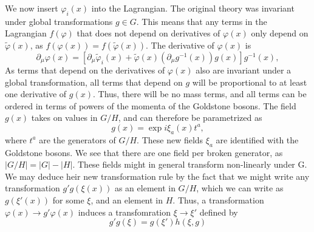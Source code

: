 \documentclass{article}
\begin{document}

We now insert $\varphi_i(x)$ into the Lagrangian.
The original theory was invariant under global transformations $g \in G$.
This means that any terms in the Lagrangian $f(\varphi)$ that does not depend on derivatives of $\varphi(x)$ only depend on $\tilde \varphi(x)$, as $f(\varphi(x)) = f(\tilde \varphi(x))$.
The derivative of $\varphi(x)$ is
\begin{equation}
    \partial_\mu \varphi(x) = [\partial_\mu \tilde \varphi_i(x) + \tilde \varphi(x) (\partial_\mu g^{-1}(x)) g(x) ]g^{-1}(x),
\end{equation}
As terms that depend on the derivatives of $\varphi(x)$ also are invariant under a global transformation, all terms that depend on $g$ will be proportional to at least one derivative of $g(x)$.
Thus, there will be no mass terms, and all terms can be ordered in terms of powers of the momenta of the Goldstone bosons.
The field $g(x)$ takes on values in $G / H$, and can therefore be parametrized as 
\begin{equation}
    g(x) = \exp{i \xi_a(x) t^a},
\end{equation}
where $t^a$ are the generators of $G / H$. 
These new fields $\xi_a$ are identified with the Goldstone bosons.
We see that there are one field per broken generator, as $|G/H| = |G| - |H|$.
These fields might in general transform non-linearly under G.
We may deduce heir new transformation rule by the fact that we might write any transformation $g' g(\xi(x))$ as an element in $G/H$, which we can write as $g(\xi'(x))$ for some $\xi$, and an element in $H$.
Thus, a transformation $\varphi(x) \rightarrow g' \varphi(x)$ induces a transfomration $\xi \rightarrow \xi'$ defined by 
\begin{equation}
    g' g(\xi) = g(\xi') h(\xi, g)
\end{equation}
\end{document}
